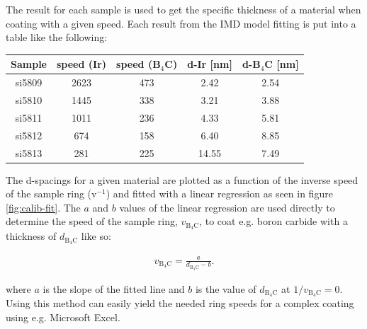 The result for each sample is used to get the specific thickness of a material when coating with a given speed. Each result from the IMD model fitting is put into a table like the following:

\begin{center}
\begin{tabular}{c|c|c|c|c}
Sample & speed (Ir) & speed (B$_4$C) & d-Ir [nm] & d-B$_4$C [nm] \\
\hline
si5809 & 2623 & 473 & 2.42 & 2.54 \\
si5810 & 1445 & 338 & 3.21 & 3.88 \\
si5811 & 1011 & 236 & 4.33 & 5.81 \\
si5812 &  674 & 158 & 6.40 & 8.85 \\
si5813 & 281 & 225 & 14.55 & 7.49
\end{tabular}
\end{center}

The d-spacings for a given material are plotted as a function of the inverse speed of the sample ring (v$^{-1}$) and fitted with a linear regression as seen in figure \ref{fig:calib-fit}. The $a$ and $b$ values of the linear regression are used directly to determine the speed of the sample ring, $v_{\mathrm{B}_4\mathrm{C}}$, to coat e.g. boron carbide with a thickness of $d_{\mathrm{B}_4\mathrm{C}}$ like so:

\begin{eqnarray}
	v_{\mathrm{B}_4\mathrm{C}} = \frac{a}{d_{\mathrm{B}_4\mathrm{C}}-b}.
\end{eqnarray}

where $a$ is the slope of the fitted line and $b$ is the value of $d_{\mathrm{B}_4\mathrm{C}}$ at $1/v_{\mathrm{B}_4\mathrm{C}} = 0$. Using this method can easily yield the needed ring speeds for a complex coating using e.g. Microsoft Excel.

